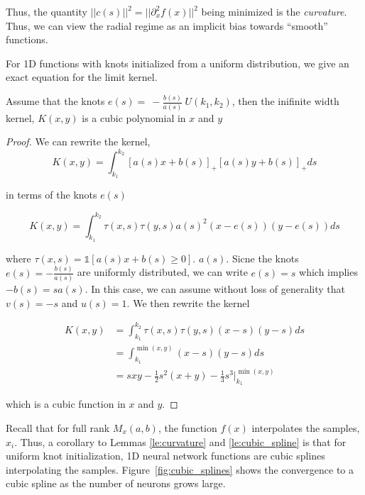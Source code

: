 Thus, the quantity $||c(s)||^2 = ||\partial_x^2 f(x)||^2$ being minimized is the \emph{curvature}. Thus, we can view the radial regime as an implicit bias towards ``smooth'' functions.



For 1D functions with knots initialized from a uniform distribution, we give an exact equation for the limit kernel. 

\begin{lemma}\label{le:cubic_spline}
Assume that the knots $e(s) =\ -\frac{b(s)}{a(s)} ~ U(k_1, k_2)$, then the inifinite width kernel, $K(x, y)$ is a cubic polynomial in $x$ and $y$
\end{lemma}
\begin{proof}

We can rewrite the kernel,
\begin{equation}
    K(x, y) = \int_{k_1}^{k_2} [a(s)x + b(s)]_+ [a(s)y + b(s)]_+ ds
\end{equation}

in terms of the knots $e(s)$

\begin{equation}
    K(x, y) = \int_{k_1}^{k_2} \tau(x, s) \tau(y, s) a(s)^2 (x - e(s)) (y - e(s)) ds
\end{equation}

where $\tau(x, s) = \mathds{1}[a(s)x + b(s) \geq 0]$. $a(s)$. Sicne the knots $e(s) = -\frac{b(s)}{a(s)}$ are uniformly distributed, we can write $e(s) = s$ which implies $-b(s) = s a(s)$. In this case, we can assume without loss of generality that $v(s) = -s$ and $u(s) = 1$. We then rewrite the kernel

\begin{equation}
    \begin{aligned}
    K(x, y) &= \int_{k_1}^{k_2} \tau(x, s) \tau(y, s) (x - s) (y - s) ds\\
            &= \int_{k_1}^{\min(x, y)} (x - s) (y - s) ds\\ 
            &= s xy - \frac{1}{2} s^2 (x + y) - \frac{1}{3} s^3 \bigg\rvert_{k_1}^{\min(x, y)}
    \end{aligned}
\end{equation}

which is a cubic function in $x$ and $y$.
\end{proof}

Recall that for full rank $M_x(a,b)$, the function $f(x)$ interpolates the samples, $x_i$. Thus, a corollary to Lemmas \ref{le:curvature} and \ref{le:cubic_spline} is that for uniform knot initialization, 1D neural network functions are cubic splines interpolating the samples. Figure~\ref{fig:cubic_splines} shows the convergence to a cubic spline as the number of neurons grows large.  

